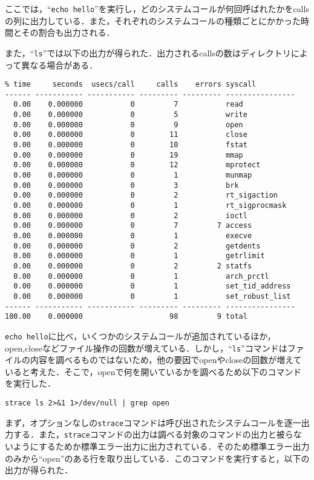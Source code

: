 \documentclass[a4j,10pt,titlepage]{jsarticle}
\begin{document}
ここでは，``\verb|echo hello|''を実行し，どのシステムコールが何回呼ばれたかをcallsの列に出力している．また，それぞれのシステムコールの種類ごとにかかった時間とその割合も出力される．

また，``\verb|ls|''では以下の出力が得られた．出力されるcallsの数はディレクトリによって異なる場合がある．
\begin{verbatim}
% time     seconds  usecs/call     calls    errors syscall
------ ----------- ----------- --------- --------- ----------------
  0.00    0.000000           0         7           read
  0.00    0.000000           0         5           write
  0.00    0.000000           0         9           open
  0.00    0.000000           0        11           close
  0.00    0.000000           0        10           fstat
  0.00    0.000000           0        19           mmap
  0.00    0.000000           0        12           mprotect
  0.00    0.000000           0         1           munmap
  0.00    0.000000           0         3           brk
  0.00    0.000000           0         2           rt_sigaction
  0.00    0.000000           0         1           rt_sigprocmask
  0.00    0.000000           0         2           ioctl
  0.00    0.000000           0         7         7 access
  0.00    0.000000           0         1           execve
  0.00    0.000000           0         2           getdents
  0.00    0.000000           0         1           getrlimit
  0.00    0.000000           0         2         2 statfs
  0.00    0.000000           0         1           arch_prctl
  0.00    0.000000           0         1           set_tid_address
  0.00    0.000000           0         1           set_robust_list
------ ----------- ----------- --------- --------- ----------------
100.00    0.000000                    98         9 total
\end{verbatim}

\verb|echo hello|に比べ，いくつかのシステムコールが追加されているほか，open,closeなどファイル操作の回数が増えている．しかし，``\verb|ls|''コマンドはファイルの内容を調べるものではないため，他の要因でopenやcloseの回数が増えていると考えた．そこで，openで何を開いているかを調べるため以下のコマンドを実行した．

\begin{verbatim}
strace ls 2>&1 1>/dev/null | grep open
\end{verbatim}

まず，オプションなしの\verb|strace|コマンドは呼び出されたシステムコールを逐一出力する．また，\verb|strace|コマンドの出力は調べる対象のコマンドの出力と被らないようにするためか標準エラー出力に出力されている．そのため標準エラー出力のみから``open''のある行を取り出している．このコマンドを実行すると，以下の出力が得られた．
\end{document}
